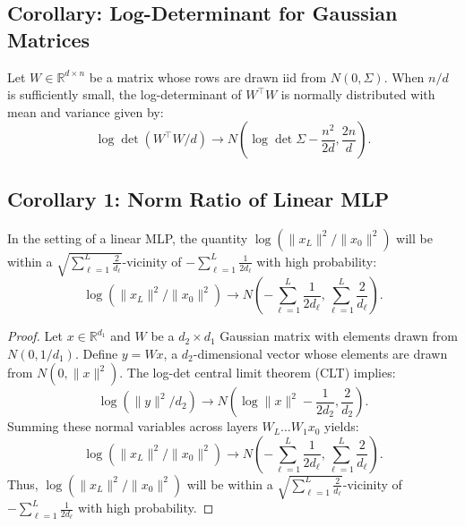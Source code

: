 \subsection{Corollary: Log-Determinant for Gaussian Matrices}

\begin{corollary}
Let \( W \in \mathbb{R}^{d \times n} \) be a matrix whose rows are drawn iid from \( N(0, \Sigma) \). When \( n/d \) is sufficiently small, the log-determinant of \( W^\top W \) is normally distributed with mean and variance given by:
\begin{equation}
\log \det(W^\top W/d) \to N\left(\log \det \Sigma - \frac{n^2}{2d}, \frac{2n}{d}\right).
\end{equation}
\end{corollary}

\subsection{Corollary 1: Norm Ratio of Linear MLP}

\begin{corollary}
In the setting of a linear MLP, the quantity \( \log(\|x_L\|^2/\|x_0\|^2) \) will be within a \( \sqrt{\sum_{\ell=1}^L\frac{2}{d_\ell}} \)-vicinity of \( -\sum_{\ell=1}^L\frac{1}{2d_\ell} \) with high probability:
\begin{equation}
\log(\|x_L\|^2/\|x_0\|^2) \to N\left(-\sum_{\ell=1}^L \frac{1}{2d_\ell}, \sum_{\ell=1}^L \frac{2}{d_\ell}\right).
\end{equation}
\end{corollary}

\begin{proof}
Let \( x \in \mathbb{R}^{d_1} \) and \( W \) be a \( d_2 \times d_1 \) Gaussian matrix with elements drawn from \( N(0,1/d_1) \). Define \( y = W x \), a \( d_2 \)-dimensional vector whose elements are drawn from \( N(0,\|x\|^2) \). The log-det central limit theorem (CLT) implies:
\begin{equation}
\log(\|y\|^2/d_2) \to N(\log\|x\|^2 - \frac{1}{2d_2}, \frac{2}{d_2}).
\end{equation}
Summing these normal variables across layers \( W_L \dots W_1 x_0 \) yields:
\begin{equation}
\log(\|x_L\|^2/\|x_0\|^2) \to N\left(-\sum_{\ell=1}^L \frac{1}{2d_\ell}, \sum_{\ell=1}^L \frac{2}{d_\ell}\right).
\end{equation}
Thus, \( \log(\|x_L\|^2/\|x_0\|^2) \) will be within a \( \sqrt{\sum_{\ell=1}^L\frac{2}{d_\ell}} \)-vicinity of \( -\sum_{\ell=1}^L \frac{1}{2d_\ell} \) with high probability.
\end{proof}

